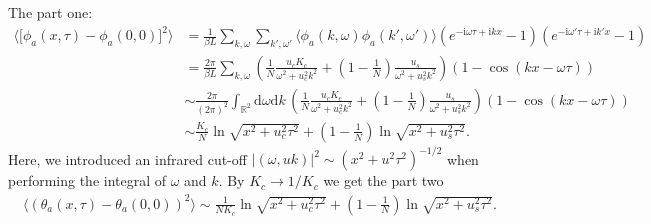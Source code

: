 \documentclass[10pt]{extarticle}
\newcommand{\dd}{\mathrm{d}}
\newcommand{\ii}{\mathrm{i}}
\begin{document}
The part one:
\begin{align*}
	\bigl\langle\bigl[\phi_a(x,\tau)-\phi_a(0,0)\bigr]^2\bigr\rangle
	&=\frac{1}{\beta L}\sum_{k,\omega}\sum_{k',\omega'}\langle \phi_a(k,\omega)\phi_a(k',\omega')\rangle (e^{-\ii \omega\tau+\ii k x}-1)(e^{-\ii \omega'\tau+\ii k' x}-1)\\
	&=\frac{2\pi}{\beta L}\sum_{k,\omega}\left(\frac{1}{N}\frac{u_c K_c}{\omega^2+u_c^2k^2}+\left(1-\frac{1}{N}\right)\frac{u_s}{\omega^2+u_s^2k^2}\right)(1-\cos(kx-\omega\tau))\\
	&\sim \frac{2\pi}{(2\pi)^2}\int_{\mathbb{R}^2} \dd\omega\dd k\,\left(\frac{1}{N}\frac{u_c K_c}{\omega^2+u_c^2k^2}+\left(1-\frac{1}{N}\right)\frac{u_s}{\omega^2+u_s^2k^2}\right)(1-\cos(kx-\omega\tau))\\
	&\sim \frac{K_c}{N} \ln \sqrt{x^2+u_c^2\tau^2}+\left(1-\frac{1}{N}\right) \ln \sqrt{x^2+u_s^2\tau^2}.
\end{align*}
Here, we introduced an infrared cut-off $|(\omega,uk)|^2\sim (x^2+u^2 \tau^2)^{-1/2}$ when performing the integral of $\omega$ and $k$. By $K_c\to 1/K_c$ we get the part two
\begin{align*}
	\langle (\theta_a(x,\tau)-\theta_a(0,0))^2\rangle\sim \frac{1}{N K_c} \ln \sqrt{x^2+u_c^2\tau^2}+\left(1-\frac{1}{N}\right) \ln \sqrt{x^2+u_s^2\tau^2}.
\end{align*}
\end{document}

